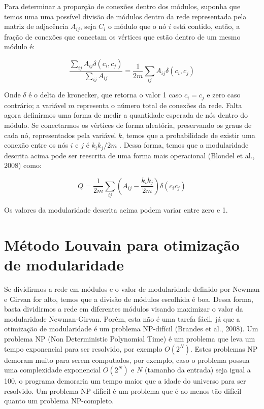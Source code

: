 \documentclass[
  12pt,
]{article}
\begin{document}
Para determinar a proporção de conexões dentro dos módulos, suponha que
temos uma uma possível divisão de módulos dentro da rede representada
pela matriz de adjacência \(A_{ij}\), seja \(C_i\) o módulo que o nó
\(i\) está contido, então, a fração de conexões que conectam os vértices
que estão dentro de um mesmo módulo é:

\begin{equation} \label{eq:fracao_conect}
    \frac{\sum_{ij} A_{ij} \delta (c_i, c_j)}{\sum_{ij} A_{ij}} = \frac{1}{2m} \sum_{ij} A_{ij} \delta (c_i, c_j) 
\end{equation}

Onde \(\delta\) é o delta de kronecker, que retorna o valor 1 caso
\(c_i = c_j\) e zero caso contrário; a variável \(m\) representa o
número total de conexões da rede. Falta agora definirmos uma forma de
medir a quantidade esperada de nós dentro do módulo. Se conectarmos os
vértices de forma aleatória, preservando os graus de cada nó,
representados pela variável \(k\), temos que a probabilidade de existir
uma conexão entre os nós \(i\) e \(j\) é \(k_i k_j / 2m\) . Dessa forma,
temos que a modularidade descrita acima pode ser reescrita de uma forma
mais operacional (Blondel et al., 2008) como:

\begin{equation} \label{eq:blondel}
    Q = \frac{1}{2m} \sum_{ij} (A_{ij} - \frac{k_i k_j}{2m}) \delta(c_i c_j)
\end{equation}

Os valores da modularidade descrita acima podem variar entre zero e 1.

\pagebreak

\hypertarget{muxe9todo-louvain-para-otimizauxe7uxe3o-de-modularidade}{%
\section{Método Louvain para otimização de
modularidade}\label{muxe9todo-louvain-para-otimizauxe7uxe3o-de-modularidade}}

Se dividirmos a rede em módulos e o valor de modularidade definido por
Newman e Girvan for alto, temos que a divisão de módulos escolhida é
boa. Dessa forma, basta dividirmos a rede em diferentes módulos visando
maximizar o valor da modularidade Newman-Girvan. Porém, esta não é uma
tarefa fácil, já que a otimização de modularidade é um problema
NP-difícil (Brandes et al., 2008). Um problema NP (Non Deterministic
Polynomial Time) é um problema que leva um tempo exponencial para ser
resolvido, por exemplo \(O(2^N)\). Estes problemas NP demoram muito para
serem computados, por exemplo, caso o problema possua uma complexidade
exponencial \(O(2^N)\) e \(N\) (tamanho da entrada) seja igual a 100, o
programa demoraria um tempo maior que a idade do universo para ser
resolvido. Um problema NP-difícil é um problema que é ao menos tão
difícil quanto um problema NP-completo.
\end{document}
